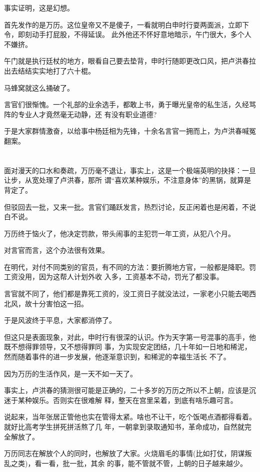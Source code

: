 \documentclass[11pt,a4paper,onecolumn]{article}
\begin{document}
事实证明，这是幻想。

首先发作的是万历。这位皇帝又不是傻子，一看就明白申时行耍两面派，立即下令，即刻动手打屁股，不得延误。
此外他还不怀好意地暗示，午门很大，多个人不嫌挤。

午门就是执行廷杖的地方，眼看自己要去垫背，申时行随即更改口风，把卢洪春拉出去结结实实地打了六十棍。

马蜂窝就这么捅破了。

言官们很惭愧。一个礼部的业余选手，都敢上书，勇于曝光皇帝的私生活，久经骂阵的专业人才竟然毫无动静，还
有没有职业道德?

于是大家群情激奋，以给事中杨廷相为先锋，十余名言官一拥而上，为卢洪春喊冤翻案。

\section[\thesection]{}

面对漫天的口水和奏疏，万历毫不退让，事实上，这是一个极端英明的抉择：一旦让步，从宽处理了卢洪春，那所
谓``喜欢某种娱乐，不注意身体''的黑锅，就算是背定了。

但驳回去一批，又来一批。言官们踊跃发言，热烈讨论，反正闲着也是闲着，不说白不说。

万历终于恼火了，他决定罚款，带头闹事的主犯罚一年工资，从犯八个月。

对言官而言，这个办法很有效果。

在明代，对付不同类别的官员，有不同的方法：要折腾地方官，一般都是降职。罚工资没用，因为这帮人计划外收
入多，工资基本不动，罚光了都没事。

言官就不同了，他们都是靠死工资的，没工资日子就没法过，一家老小只能去喝西北风，故十分害怕这一招。

于是风波终于平息，大家都消停了。

但这只是表面现象，对此，申时行有很深的认识。作为天字第一号混事的高手，他既不想得罪领导，又不想得罪同
事，为实现安定团结，几十年如一日地和稀泥，然而随着事件的进一步发展，他逐渐意识到，和稀泥的幸福生活长
不了。

因为万历的生活作风，是一天不如一天了。

事实上，卢洪春的猜测很可能是正确的，二十多岁的万历之所以不上朝，应该是沉迷于某种娱乐。否则实在很难解
释，整天在宫里呆着，到底有啥乐趣可言。

说起来，当年张居正管他也实在管得太紧。啥也不让干，吃个饭喝点酒都得看着。就好比高考学生拼死拼活熬了几
年，一朝拿到录取通知书，革命成功，自然就完全解放了。

万历同志在解放个人的同时，也解放了大家。火烧眉毛的事情(比如打仗，阴谋叛乱之类)，看一看，批一批，其余
的事，能不管就不管，上朝的日子越来越少。
\end{document}
